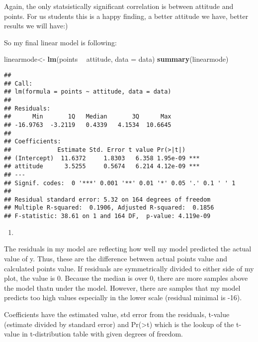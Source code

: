 \documentclass[
]{article}
\newenvironment{Shaded}{\begin{snugshade}}{\end{snugshade}}
\newcommand{\DataTypeTok}[1]{\textcolor[rgb]{0.13,0.29,0.53}{#1}}
\newcommand{\KeywordTok}[1]{\textcolor[rgb]{0.13,0.29,0.53}{\textbf{#1}}}
\newcommand{\NormalTok}[1]{#1}
\newcommand{\OperatorTok}[1]{\textcolor[rgb]{0.81,0.36,0.00}{\textbf{#1}}}
\newcommand{\StringTok}[1]{\textcolor[rgb]{0.31,0.60,0.02}{#1}}
\begin{document}
Again, the only statsistically significant correlation is between
attitude and points. For us students this is a happy finding, a better
attitude we have, better results we will have:)

So my final linear model is following:

\begin{Shaded}
\begin{Highlighting}[]
\NormalTok{linearmode<-}\StringTok{ }\KeywordTok{lm}\NormalTok{(points }\OperatorTok{~}\StringTok{ }\NormalTok{attitude, }\DataTypeTok{data =}\NormalTok{ data)}
\KeywordTok{summary}\NormalTok{(linearmode)}
\end{Highlighting}
\end{Shaded}

\begin{verbatim}
## 
## Call:
## lm(formula = points ~ attitude, data = data)
## 
## Residuals:
##      Min       1Q   Median       3Q      Max 
## -16.9763  -3.2119   0.4339   4.1534  10.6645 
## 
## Coefficients:
##             Estimate Std. Error t value Pr(>|t|)    
## (Intercept)  11.6372     1.8303   6.358 1.95e-09 ***
## attitude      3.5255     0.5674   6.214 4.12e-09 ***
## ---
## Signif. codes:  0 '***' 0.001 '**' 0.01 '*' 0.05 '.' 0.1 ' ' 1
## 
## Residual standard error: 5.32 on 164 degrees of freedom
## Multiple R-squared:  0.1906, Adjusted R-squared:  0.1856 
## F-statistic: 38.61 on 1 and 164 DF,  p-value: 4.119e-09
\end{verbatim}

\begin{enumerate}
\def\labelenumi{\arabic{enumi}.}
\setcounter{enumi}{3}
\item
\end{enumerate}

The residuals in my model are reflecting how well my model predicted the
actual value of y. Thus, these are the difference between actual points
value and calculated points value. If residuals are symmetrically
divided to either side of my plot, the value is 0. Because the median is
over 0, there are more samples above the model thatn under the model.
However, there are samples that my model predicts too high values
especially in the lower scale (residual minimal is -16).

Coefficients have the estimated value, std error from the residuals,
t-value (estimate divided by standard error) and
Pr(\textgreater{}\textbar{}t\textbar{}) which is the lookup of the
t-value in t-distribution table with given degrees of freedom.
\end{document}
